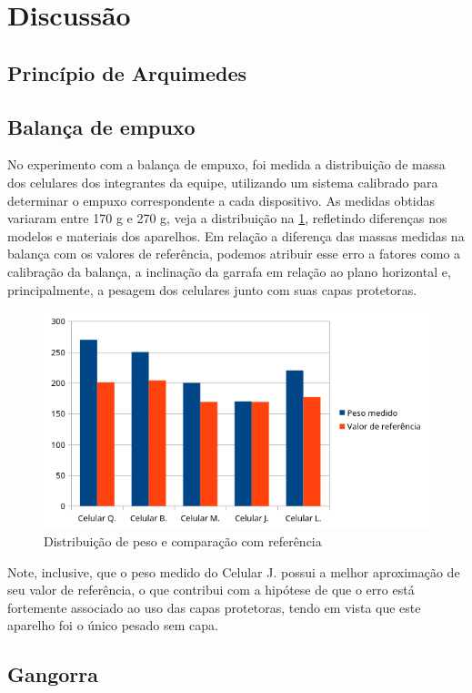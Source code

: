 \section{Discussão}
\subsection{Princípio de Arquimedes}

\subsection{Balança de empuxo}
No experimento com a balança de empuxo, foi medida a distribuição de massa dos
celulares dos integrantes da equipe, utilizando um sistema calibrado para
determinar o empuxo correspondente a cada dispositivo. As medidas obtidas
variaram entre 170 g e 270 g, veja a distribuição na \cref{pesos}, refletindo
diferenças nos modelos e materiais dos
aparelhos. Em relação a diferença das massas medidas na balança com os valores
de referência, podemos atribuir esse erro a fatores como a calibração da
balança, a inclinação da garrafa em relação ao plano horizontal e, 
principalmente, a pesagem dos celulares junto com suas capas protetoras.
\begin{figure}[H]
    \centering
    \includegraphics[width=.5\linewidth]{fig/pesos.png}
    \caption{Distribuição de peso e comparação com referência}
    \label{pesos}
\end{figure}
Note, inclusive, que o peso medido do Celular J. possui a melhor aproximação de
seu valor de referência, o que contribui com a hipótese de que o erro está
fortemente associado ao uso das capas protetoras, tendo em vista que este
aparelho foi o único pesado sem capa.
\subsection{Gangorra}

